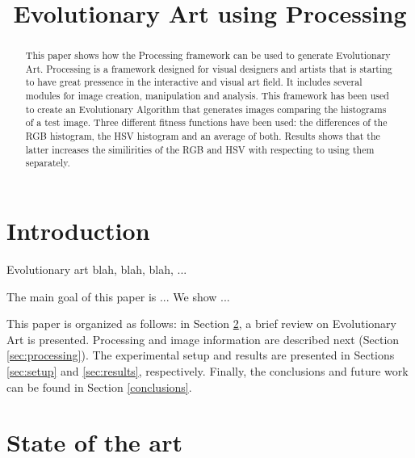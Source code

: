\documentclass[conference]{IEEEtran}
\begin{document}
\title{Evolutionary Art using Processing}
\author{
\and
{}
\and
{}
}

\maketitle

\begin{abstract}
This paper shows how the Processing framework can be used to generate Evolutionary Art. Processing is a framework designed for visual designers and artists that is starting to have great pressence in the interactive and visual art field. It includes several modules for image creation, manipulation and analysis. This framework has been used to create an Evolutionary Algorithm that generates images comparing the histograms of a test image. Three different fitness functions have been used: the differences of the RGB histogram, the HSV histogram and an average of both. Results shows that the latter increases the similirities of the RGB and HSV with respecting to using them separately.
\end{abstract}

\section{Introduction}\label{intro}
Evolutionary art blah, blah, blah, ...

The main goal of this paper is ... We show ...

This paper is organized as follows: in Section \ref{sec:soa}, a brief review on Evolutionary Art is presented. Processing and image information are described next (Section \ref{sec:processing}). The experimental setup and results are presented in Sections \ref{sec:setup} and \ref{sec:results}, respectively. Finally, the conclusions and future work can be found in Section \ref{conclusions}.

\section{State of the art}
\label{sec:soa}
\end{document}
